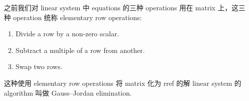 \begin{definition}{}

之前我们对 linear system 中 equations 的三种 operations 用在 matrix 上，这三种 operation 统称 elementary row operations:

\begin{enumerate}
\tightlist
\item
  Divide a row by a non-zero scalar.
\item
  Subtract a multiple of a row from another.
\item
  Swap two rows.
\end{enumerate}

这种使用 elementary row operations 将 matrix 化为 rref 的解 linear system 的 algorithm 叫做 Gauss--Jordan elimination.

\end{definition}
